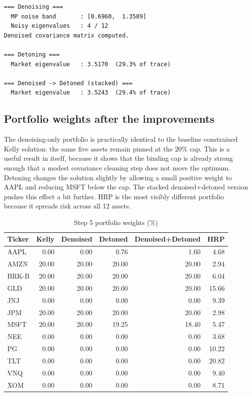 \documentclass[11pt,a4paper]{article}
\begin{document}
\begin{verbatim}
=== Denoising ===
  MP noise band       : [0.6960,  1.3589]
  Noisy eigenvalues   : 4 / 12
Denoised covariance matrix computed.

=== Detoning ===
  Market eigenvalue   : 3.5170  (29.3% of trace)

=== Denoised -> Detoned (stacked) ===
  Market eigenvalue   : 3.5243  (29.4% of trace)
\end{verbatim}

\subsection{Portfolio weights after the improvements}

The denoising-only portfolio is practically identical to the baseline constrained Kelly solution:
the same five assets remain pinned at the 20\% cap. This is a useful result in itself, because it
shows that the binding cap is already strong enough that a modest covariance cleaning step does
not move the optimum. Detoning changes the solution slightly by allowing a small positive weight
to AAPL and reducing MSFT below the cap. The stacked denoised+detoned version pushes this
effect a bit further. HRP is the most visibly different portfolio because it spreads risk across all
12 assets.

\begin{table}[H]
\centering
\caption{Step 5 portfolio weights (\%)}
\label{tab:step5_weights}
{\scriptsize\setlength{\tabcolsep}{4pt}\renewcommand{\arraystretch}{1.12}\begin{tabular}{lrrrrr}
\toprule
Ticker & Kelly & Denoised & Detoned & Denoised+Detoned & HRP \\
\midrule
AAPL  & 0.00 & 0.00 & 0.76 & 1.60 & 4.68 \\
AMZN  & 20.00 & 20.00 & 20.00 & 20.00 & 2.94 \\
BRK-B & 20.00 & 20.00 & 20.00 & 20.00 & 6.04 \\
GLD   & 20.00 & 20.00 & 20.00 & 20.00 & 15.66 \\
JNJ   & 0.00 & 0.00 & 0.00 & 0.00 & 9.39 \\
JPM   & 20.00 & 20.00 & 20.00 & 20.00 & 2.98 \\
MSFT  & 20.00 & 20.00 & 19.25 & 18.40 & 5.47 \\
NEE   & 0.00 & 0.00 & 0.00 & 0.00 & 3.68 \\
PG    & 0.00 & 0.00 & 0.00 & 0.00 & 10.22 \\
TLT   & 0.00 & 0.00 & 0.00 & 0.00 & 20.82 \\
VNQ   & 0.00 & 0.00 & 0.00 & 0.00 & 9.40 \\
XOM   & 0.00 & 0.00 & 0.00 & 0.00 & 8.71 \\
\bottomrule
\end{tabular}}
\end{table}
\end{document}

